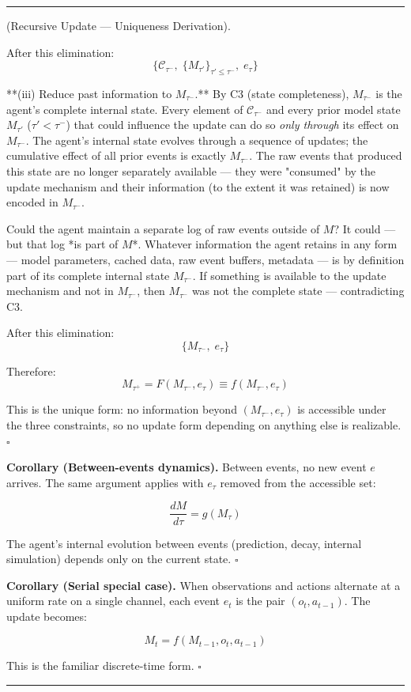 \documentclass[11pt,oneside]{article}
\newcounter{claim}[section]
\renewcommand{\theclaim}{\thesection.\arabic{claim}}
\newenvironment{segment}[2]{%
  \refstepcounter{claim}%
  \bigskip\noindent\hrule\smallskip
  \noindent{\bfseries #1~\theclaim}\enskip(#2).\par\smallskip
  \noindent\ignorespaces
}{%
  \par\smallskip\noindent\hrule\bigskip
}
\newenvironment{derivation}[1][]{\begin{segment}{Derivation}{#1}}{\end{segment}}
\begin{document}
\begin{derivation}[Recursive Update — Uniqueness Derivation]
After this elimination:
$$\{\mathcal{C}_{\tau^-},\; \{M_{\tau'}\}_{\tau' \leq \tau^-},\; e_\tau\}$$

**(iii) Reduce past information to $M_{\tau^-}$.** By C3 (state completeness), $M_{\tau^-}$ is the agent's complete internal state. Every element of $\mathcal{C}_{\tau^-}$ and every prior model state $M_{\tau'}$ ($\tau' < \tau^-$) that could influence the update can do so \textit{only through} its effect on $M_{\tau^-}$. The agent's internal state evolves through a sequence of updates; the cumulative effect of all prior events is exactly $M_{\tau^-}$. The raw events that produced this state are no longer separately available — they were "consumed" by the update mechanism and their information (to the extent it was retained) is now encoded in $M_{\tau^-}$.

Could the agent maintain a separate log of raw events outside of $M$? It could — but that log *is part of $M$*. Whatever information the agent retains in any form — model parameters, cached data, raw event buffers, metadata — is by definition part of its complete internal state $M_{\tau^-}$. If something is available to the update mechanism and not in $M_{\tau^-}$, then $M_{\tau^-}$ was not the complete state — contradicting C3.

After this elimination:
$$\{M_{\tau^-},\; e_\tau\}$$

Therefore:
$$M_{\tau^+} = F(M_{\tau^-}, e_\tau) \equiv f(M_{\tau^-}, e_\tau)$$

This is the unique form: no information beyond $(M_{\tau^-}, e_\tau)$ is accessible under the three constraints, so no update form depending on anything else is realizable. $\square$

\textbf{Corollary (Between-events dynamics).} Between events, no new event $e$ arrives. The same argument applies with $e_\tau$ removed from the accessible set:

$$\frac{dM}{d\tau} = g(M_\tau)$$

The agent's internal evolution between events (prediction, decay, internal simulation) depends only on the current state. $\square$

\textbf{Corollary (Serial special case).} When observations and actions alternate at a uniform rate on a single channel, each event $e_t$ is the pair $(o_t, a_{t-1})$. The update becomes:

$$M_t = f(M_{t-1}, o_t, a_{t-1})$$

This is the familiar discrete-time form. $\square$



\end{derivation}
\end{document}
